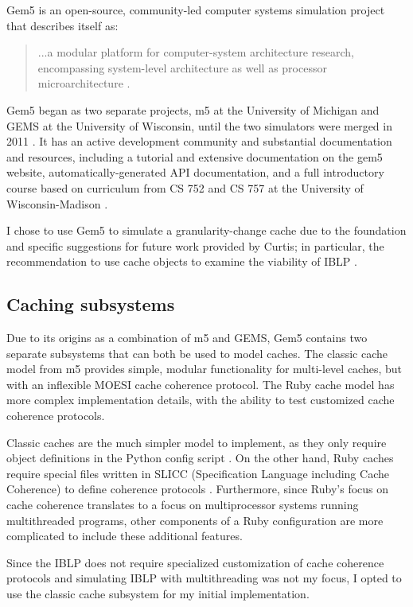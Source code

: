 \documentclass[12pt,twoside]{reedthesis}
\begin{document}
Gem5 is an open-source, community-led computer systems simulation project that describes itself as: \begin{quote}
	...a modular platform for computer-system architecture research, encompassing system-level architecture as well as processor microarchitecture \cite{gem5-about}.
\end{quote}

Gem5 began as two separate projects, m5 at the University of Michigan and GEMS at the University of Wisconsin, until the two simulators were merged in 2011 \cite{gem5-about}. It has an active development community and substantial documentation and resources, including a tutorial and extensive documentation on the gem5 website, automatically-generated API documentation, and a full introductory course based on curriculum from CS 752 and CS 757 at the University of Wisconsin-Madison \cite{gem5-docs}.

I chose to use Gem5 to simulate a granularity-change cache due to the foundation and specific suggestions for future work provided by Curtis; in particular, the recommendation to use cache objects to examine the viability of IBLP \cite{curtis}.

	\subsection*{Caching subsystems}

	Due to its origins as a combination of m5 and GEMS, Gem5 contains two separate subsystems that can both be used to model caches. The classic cache model from m5 provides simple, modular functionality for multi-level caches, but with an inflexible MOESI cache coherence protocol. The Ruby cache model has more complex implementation details, with the ability to test customized cache coherence protocols.

	Classic caches are the much simpler model to implement, as they only require object definitions in the Python config script \cite{gem5-tutorial}. On the other hand, Ruby caches require special files written in SLICC (Specification Language including Cache Coherence) to define coherence protocols \cite{gem5-ruby}. Furthermore, since Ruby's focus on cache coherence translates to a focus on multiprocessor systems running multithreaded programs, other components of a Ruby configuration are more complicated to include these additional features.

	Since the IBLP does not require specialized customization of cache coherence protocols and simulating IBLP with multithreading was not my focus, I opted to use the classic cache subsystem for my initial implementation.
\end{document}
